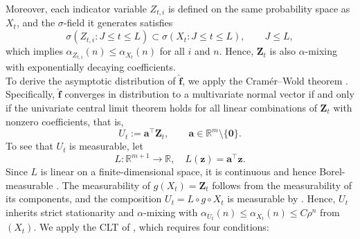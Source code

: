 ﻿\documentclass[12pt,a4paper]{scrreprt}
\theoremstyle{definition}
\begin{document}
Moreover, each indicator variable $Z_{t,i}$ is defined on the same probability space
as $X_t$, and the $\sigma$-field it generates satisfies
\[
\sigma(Z_{t,i} : J \le t \le L) \subset \sigma(X_t : J \le t \le L), \qquad J \le L,
\]
which implies $\alpha_{Z_{t,i}}(n) \le \alpha_{X_t}(n)$ for all $i$ and $n$. Hence,
$\boldsymbol{Z}_t$ is also $\alpha$-mixing with exponentially
decaying coefficients.\\
To derive the asymptotic distribution of $\hat{\boldsymbol{f}}$, we
apply the Cramér–Wold theorem \citep[Corollary 4.5]{kallenberg_2021}. 
Specifically, $\hat{\boldsymbol{f}}$ converges in distribution to a 
multivariate normal vector if and only if the univariate central limit theorem holds for all linear combinations of $\boldsymbol{Z}_t$ with nonzero coefficients, that is,
\[
U_t := \boldsymbol{a}^{\top}\boldsymbol{Z}_t, \qquad 
\boldsymbol{a} \in \mathbb{R}^{m}\setminus\{\boldsymbol{0}\}.
\]
To see that $U_t$ is measurable, let
\[
L: \mathbb{R}^{m+1} \rightarrow \mathbb{R}, \quad L(\boldsymbol{z}) = \boldsymbol{a}^{\top}\boldsymbol{z}.
\]
Since $L$ is linear on a finite-dimensional space, it is continuous 
and hence Borel-measurable \citep[Theorem~1.88]{klenke2005}. 
The measurability of $g(X_t) = \boldsymbol{Z}_t$ follows from the 
measurability of its components, and the composition 
$U_t = L \circ g \circ X_t$ is measurable by 
\citet[Theorem~1.80]{klenke2005}. Hence, $U_t$ inherits strict stationarity and $\alpha$-mixing with
$\alpha_{U_t}(n) \le \alpha_{X_t}(n) \le C\rho^n$ from $(X_t)$. We apply the CLT of
\citet[Theorem 7]{Ibragimov1962}, which requires four conditions:
\end{document}
